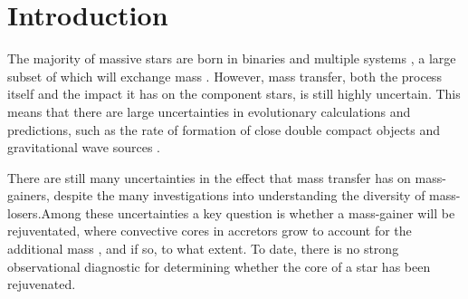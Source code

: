 \documentclass[twocolumn, twocolappendix, oneside]{aastex631}
\begin{document}

{\hypersetup{linkcolor=black}\listoftodos}

\clearpage

\section{Introduction} \label{sec:intro}


The majority of massive stars are born in binaries and multiple systems \citep[e.g.][]{Mason+2009, Almeida+2017, Moe+2017}, a large subset of which will exchange mass \citep[e.g][]{Sana+2012}. However, mass transfer, both the process itself and the impact it has on the component stars, is still highly uncertain. This means that there are large uncertainties in evolutionary calculations and predictions, such as the rate of formation of close double compact objects and gravitational wave sources \citep[e.g.][]{Broekgaarden+2022}.

There are still many uncertainties in the effect that mass transfer has on mass-gainers, despite the many investigations into understanding the diversity of mass-losers.Among these uncertainties a key question is whether a mass-gainer will be rejuventated, where convective cores in accretors grow to account for the additional mass \citep[e.g.][]{Neo+1977}, and if so, to what extent. To date, there is no strong observational diagnostic for determining whether the core of a star has been rejuvenated.
\end{document}
